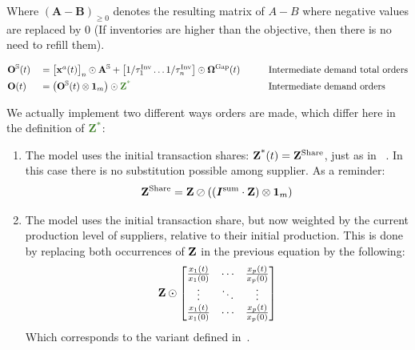 \documentclass[main.tex]{subfiles}
\begin{document}
Where $(\bm{A} - \bm{B})_{\geq 0}$ denotes the resulting matrix of $A -
B$ where negative values are replaced by 0 (If inventories are higher than the
objective, then there is no need to refill them).

\begin{alignat*}{4}
  & \ioorders^{\sectorsset}(t) &  & = \begin{bmatrix}
    \iox^a(t) \end{bmatrix}_{n} \odot  \ioa^{\sectorsset} + \begin{bmatrix} 1 / \tau^{\textrm{Inv}}_1 \hdots 1 / \tau^{\textrm{Inv}}_n  \end{bmatrix} \odot \ioinv^{\textrm{Gap}}(t) &  & \quad &  & \text{Intermediate demand total orders}\\
 & \ioorders(t)               &  & = \left ( \ioorders^{\sectorsset}(t) \otimes \bm{1}_{m} \right ) \odot  {\textcolor{OliveGreen}{\ioz^{\textrm{*}}}} &  & \quad &  & \text{Intermediate demand orders}
\end{alignat*}

We actually implement two different ways orders are made, which differ here in
the definition of ${\textcolor{OliveGreen}{\ioz^{\textrm{*}}}}$:

\begin{enumerate}
\item The model uses the initial transaction shares: $\mathbf{Z}^{\textrm{*}}(t) =
  \mathbf{Z}^{\textrm{Share}}$, just as in
 ~\textcite{hallegatte-2013-model-role}. In this case there is no
  substitution possible among supplier. As a reminder:
  \[
  \begin{split}
    \mathbf{Z}^{\textrm{Share}} =  \mathbf{Z} \oslash \left ( \left (
    \bm{I^{\textrm{sum}}} \cdot  \mathbf{Z} \right ) \otimes
    \bm{1}_{m}
    \right )
  \end{split}
\]
\item The model uses the initial transaction share, but now weighted by the
  current production level of suppliers, relative to their initial production. This
  is done by replacing both occurrences of $\mathbf{Z}$ in the previous equation by
  the following:
  \[
    \begin{split}
      \mathbf{Z} \odot
      \begin{bmatrix}
        \frac{x_{1}(t)}{x_{1}(0)} & \cdots & \frac{x_{p}(t)}{x_{p}(0)}\\
        \vdots & \ddots & \vdots \\
        \frac{x_{1}(t)}{x_{1}(0)} & \cdots & \frac{x_{p}(t)}{x_{p}(0)}
      \end{bmatrix}
    \end{split}
  \]
  Which corresponds to the variant defined in~\textcite{guan-2020-global-suppl}.
\end{enumerate}
\end{document}
